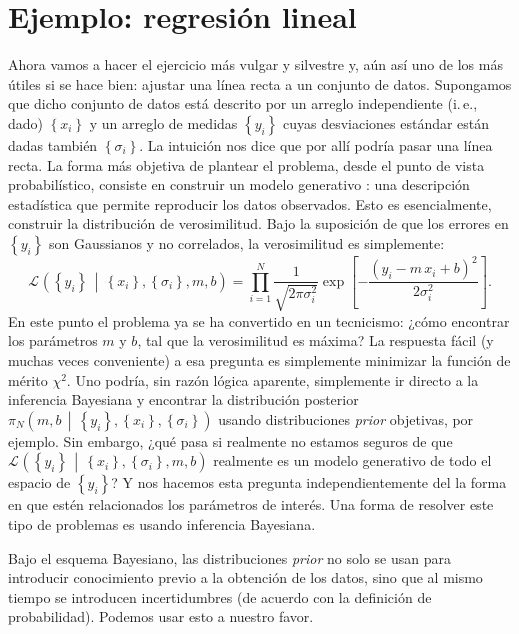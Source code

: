 \documentclass[a4paper,twoside]{article}
\newcommand{\pos}[2]{\ensuremath{\pi_N\left(#1\,\middle|\, #2\right)}\xspace}
\newcommand{\lik}[3][]{\ensuremath{\mathcal{L}_{#1}\left(#2\,\middle|\, #3\right)}\xspace}
\newcommand{\set}[1]{\ensuremath{\left\{#1\right\}}\xspace}
\begin{document}

\section{Ejemplo: regresión lineal}
%
Ahora vamos a hacer el ejercicio más vulgar y silvestre y, aún así uno de los más útiles si se hace
bien: ajustar una línea recta a un conjunto de datos. Supongamos que dicho conjunto de datos está
descrito por un arreglo independiente (i.\,e., dado) $\set{x_i}$ y un arreglo de medidas
$\set{y_i}$ cuyas desviaciones estándar están dadas también $\set{\sigma_i}$.
La intuición nos dice que por allí podría pasar una línea recta. La forma más objetiva de plantear
el problema, desde el punto de vista probabilístico, consiste en construir un modelo generativo
\citep{Hogg2010}: una descripción estadística que permite reproducir los datos observados. Esto es
esencialmente, construir la distribución de verosimilitud. Bajo la suposición de que los errores en
$\set{y_i}$ son Gaussianos y no correlados, la verosimilitud es simplemente:
%
$$\lik{\set{y_i}}{\set{x_i},\set{\sigma_i},m,b} = \prod_{i=1}^N\frac{1}{\sqrt{2\pi\sigma_i^2}}\exp{\left[-\frac{\left(y_i-m\,x_i+b\right)^2}{2\sigma_i^2}\right]}.$$
%
En este punto el problema ya se ha convertido en un tecnicismo: ¿cómo encontrar los parámetros $m$
y $b$, tal que la verosimilitud es máxima? La respuesta fácil (y muchas veces conveniente) a esa
pregunta es simplemente minimizar la función de mérito $\chi^2$.
Uno podría, sin razón lógica aparente, simplemente ir directo a la inferencia Bayesiana y encontrar
la distribución posterior $\pos{m,b}{\set{y_i},\set{x_i},\set{\sigma_i}}$ usando distribuciones
\emph{prior} objetivas, por ejemplo.
Sin embargo, ¿qué pasa si realmente no estamos seguros de que
$\lik{\set{y_i}}{\set{x_i},\set{\sigma_i},m,b}$ realmente es un modelo generativo de todo el
espacio de $\set{y_i}$? Y nos hacemos esta pregunta independientemente del la forma en que estén
relacionados los parámetros de interés.
Una forma de resolver este tipo de problemas es usando inferencia Bayesiana.

Bajo el esquema Bayesiano, las distribuciones \emph{prior} no solo se usan para introducir
conocimiento previo a la obtención de los datos, sino que al mismo tiempo se introducen
incertidumbres (de acuerdo con la definición de probabilidad). Podemos usar esto a nuestro favor.
\end{document}
